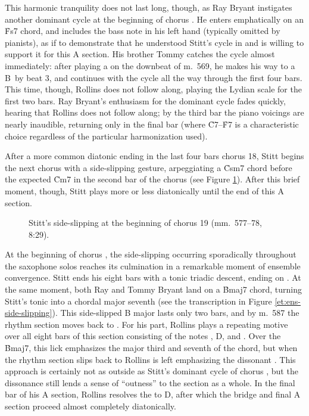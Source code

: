 This harmonic tranquility does not last long, though, as Ray Bryant instigates
another dominant cycle at the beginning of chorus . He enters
emphatically on an \h{Fs7} chord, and includes the bass note in his left hand
(typically omitted by pianists), as if to demonstrate that he understood
Stitt's cycle in  and is willing to support it for this A section.
His brother Tommy catches the cycle almost immediately: after playing a \Bflat
on the downbeat of m.~569, he makes his way to a B\nat\ by beat 3, and
continues with the cycle all the way through the first four bars. This time,
though, Rollins does not follow along, playing the \Bflat Lydian scale
for the first two bars. Ray Bryant's enthusiasm for the dominant cycle fades
quickly, hearing that Rollins does not follow along; by the third bar the
piano voicings are nearly inaudible, returning only in the final bar (where
\h{C7}--\h{F7} is a characteristic choice regardless of the particular
harmonization used).

After a more common diatonic ending in the last four bars chorus 18, Stitt
begins the next chorus with a side-slipping gesture, arpeggiating a \h{Csm7}
chord before the expected \h{Cm7} in the second bar of the chorus (see Figure
\ref{et:ss-side-slipping}). After this brief moment, though, Stitt plays more
or less diatonically until the end of this A section.

\begin{figure}[tbp]
  \caption[Stitt's side-slipping at the beginning of chorus 19.]{%
    Stitt's side-slipping at the beginning of chorus 19 (mm.~577--78, 8:29).}
  \label{et:ss-side-slipping}
\end{figure}

At the beginning of chorus , the side-slipping occurring
sporadically throughout the saxophone solos reaches its culmination in a
remarkable moment of ensemble convergence. Stitt ends his eight bars with a
tonic triadic descent, ending on \Bflat. At the same moment, both Ray and
Tommy Bryant land on a \h{Bmaj7} chord, turning Stitt's tonic \Bflat into a
chordal major seventh (see the transcription in Figure
\ref{et:ens-side-slipping}). This side-slipped B major lasts only
two bars, and by m.~587 the rhythm section moves back to \Bflat. For his part,
Rollins plays a repeating motive over all eight bars of this section
consisting of the notes \Eflat, D, and \Bflat. Over the \h{Bmaj7}, this lick
emphasizes the major third and seventh of the chord, but when the rhythm
section slips back to \Bflat Rollins is left emphasizing the dissonant .
This approach is certainly not as outside as Stitt's dominant cycle of chorus
, but the dissonance still lends a sense of ``outness'' to the
section as a whole. In the final bar of his A section, Rollins resolves the
\Eflat to D, after which the bridge and final A section proceed almost
completely diatonically.

